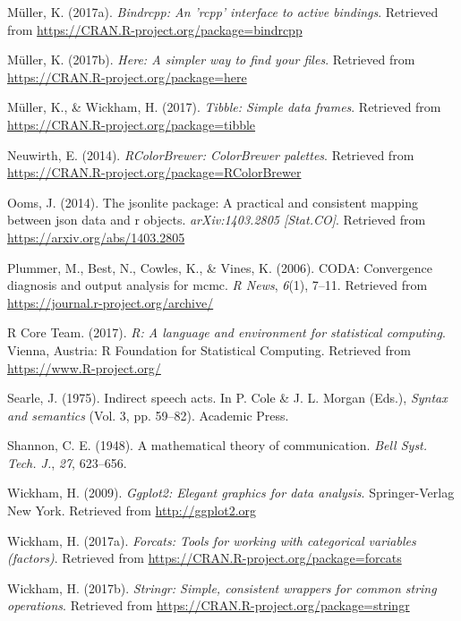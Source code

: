 \documentclass[floatsintext,man]{apa6}
\theoremstyle{definition}
\theoremstyle{definition}
\theoremstyle{definition}
\theoremstyle{remark}
\begin{document}
\hypertarget{ref-R-bindrcpp}{}
Müller, K. (2017a). \emph{Bindrcpp: An 'rcpp' interface to active
bindings}. Retrieved from
\url{https://CRAN.R-project.org/package=bindrcpp}

\hypertarget{ref-R-here}{}
Müller, K. (2017b). \emph{Here: A simpler way to find your files}.
Retrieved from \url{https://CRAN.R-project.org/package=here}

\hypertarget{ref-R-tibble}{}
Müller, K., \& Wickham, H. (2017). \emph{Tibble: Simple data frames}.
Retrieved from \url{https://CRAN.R-project.org/package=tibble}

\hypertarget{ref-R-RColorBrewer}{}
Neuwirth, E. (2014). \emph{RColorBrewer: ColorBrewer palettes}.
Retrieved from \url{https://CRAN.R-project.org/package=RColorBrewer}

\hypertarget{ref-R-jsonlite}{}
Ooms, J. (2014). The jsonlite package: A practical and consistent
mapping between json data and r objects. \emph{arXiv:1403.2805
{[}Stat.CO{]}}. Retrieved from \url{https://arxiv.org/abs/1403.2805}

\hypertarget{ref-R-coda}{}
Plummer, M., Best, N., Cowles, K., \& Vines, K. (2006). CODA:
Convergence diagnosis and output analysis for mcmc. \emph{R News},
\emph{6}(1), 7--11. Retrieved from
\url{https://journal.r-project.org/archive/}

\hypertarget{ref-R-base}{}
R Core Team. (2017). \emph{R: A language and environment for statistical
computing}. Vienna, Austria: R Foundation for Statistical Computing.
Retrieved from \url{https://www.R-project.org/}

\hypertarget{ref-searle1975}{}
Searle, J. (1975). Indirect speech acts. In P. Cole \& J. L. Morgan
(Eds.), \emph{Syntax and semantics} (Vol. 3, pp. 59--82). Academic
Press.

\hypertarget{ref-shannon1948}{}
Shannon, C. E. (1948). A mathematical theory of communication.
\emph{Bell Syst. Tech. J.}, \emph{27}, 623--656.

\hypertarget{ref-R-ggplot2}{}
Wickham, H. (2009). \emph{Ggplot2: Elegant graphics for data analysis}.
Springer-Verlag New York. Retrieved from \url{http://ggplot2.org}

\hypertarget{ref-R-forcats}{}
Wickham, H. (2017a). \emph{Forcats: Tools for working with categorical
variables (factors)}. Retrieved from
\url{https://CRAN.R-project.org/package=forcats}

\hypertarget{ref-R-stringr}{}
Wickham, H. (2017b). \emph{Stringr: Simple, consistent wrappers for
common string operations}. Retrieved from
\url{https://CRAN.R-project.org/package=stringr}
\end{document}
